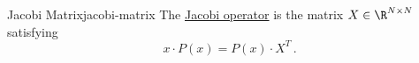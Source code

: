 \begin{definition}{Jacobi Matrix}{jacobi-matrix}
  The \href{https://en.wikipedia.org/wiki/Jacobi_operator}{Jacobi operator} is the matrix \(X \in \R^{N \times N}\) satisfying
  $$x \cdot P(x) = P(x) \cdot X^T\,.$$
\end{definition}
